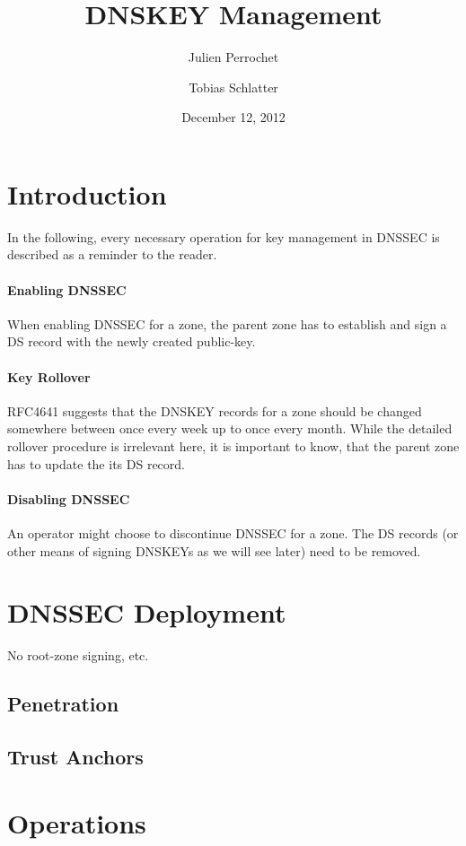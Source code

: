 \documentclass[a4paper, twocolumn]{scrartcl}
\title{DNSKEY Management}
\author{Julien Perrochet \and Tobias Schlatter}
\date{December 12, 2012}
\begin{document}
\maketitle

\section{Introduction}

In the following, every necessary operation for key management in
DNSSEC is described as a reminder to the reader.

\paragraph{Enabling DNSSEC} When enabling DNSSEC for a zone, the
parent zone has to establish and sign a DS record with the newly
created public-key.

\paragraph{Key Rollover} RFC4641 \cite{RFC4641} suggests that the DNSKEY
records for a zone should be changed somewhere between once every week
up to once every month. While the detailed rollover procedure is
irrelevant here, it is important to know, that the parent zone has to
update the its DS record.

\paragraph{Disabling DNSSEC} An operator might choose to discontinue
DNSSEC for a zone. The DS records (or other means of signing DNSKEYs
as we will see later) need to be removed.

\section{DNSSEC Deployment}
No root-zone signing, etc.
\subsection{Penetration}
\subsection{Trust Anchors}

\section{Operations}
\end{document}
